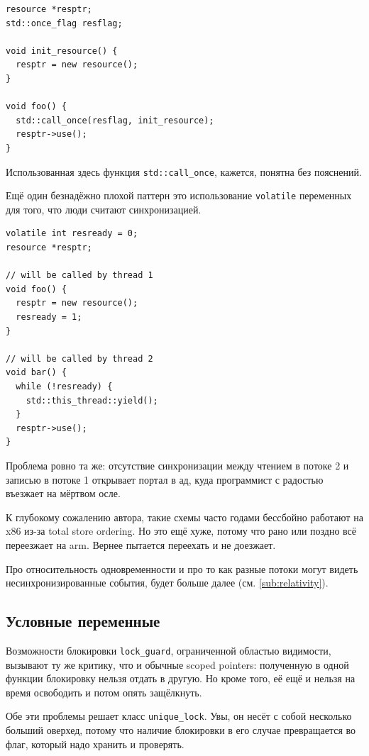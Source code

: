 \documentclass[a4paper,12pt,oneside]{book}
\begin{document}
\begin{lstlisting}
resource *resptr;
std::once_flag resflag;

void init_resource() {
  resptr = new resource();
}

void foo() {
  std::call_once(resflag, init_resource);
  resptr->use();
}
\end{lstlisting}

Использованная здесь функция \lstinline!std::call_once!, кажется, понятна без пояснений.

Ещё один безнадёжно плохой паттерн это использование \lstinline!volatile! переменных для того, что люди считают синхронизацией.

\begin{lstlisting}
volatile int resready = 0;
resource *resptr;

// will be called by thread 1
void foo() {
  resptr = new resource();
  resready = 1;
}

// will be called by thread 2
void bar() {
  while (!resready) {
    std::this_thread::yield();
  }
  resptr->use();
}
\end{lstlisting}

Проблема ровно та же: отсутствие синхронизации между чтением в потоке 2 и записью в потоке 1 открывает портал в ад, куда программист с радостью въезжает на мёртвом осле.

К глубокому сожалению автора, такие схемы часто годами бессбойно работают на x86 из-за total store ordering. Но это ещё хуже, потому что рано или поздно всё переезжает на arm. Вернее пытается переехать и не доезжает.

Про относительность одновременности и про то как разные потоки могут видеть несинхронизированные события, будет больше далее (см. \ref{sub:relativity}).

\subsection{Условные переменные}\label{sub:condvars}

Возможности блокировки \lstinline!lock_guard!, ограниченной областью видимости, вызывают ту же критику, что и обычные scoped pointers: полученную в одной функции блокировку нельзя отдать в другую. Но кроме того, её ещё и нельзя на время освободить и потом опять защёлкнуть.

Обе эти проблемы решает класс \lstinline!unique_lock!. Увы, он несёт с собой несколько больший оверхед, потому что наличие блокировки в его случае превращается во флаг, который надо хранить и проверять.
\end{document}
